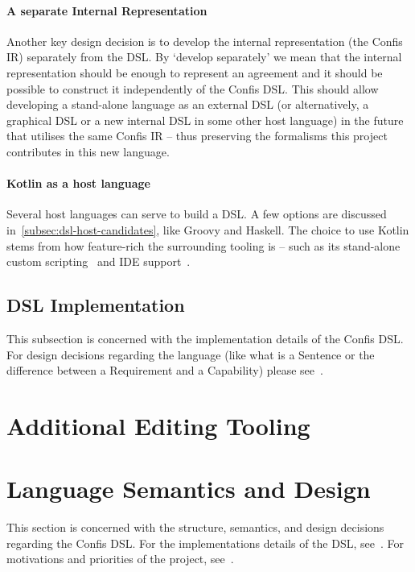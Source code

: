 \paragraph{A separate Internal Representation}
Another key design decision is to develop the internal representation (the Confis IR) separately from the DSL.
By `develop separately' we mean that the internal representation should be enough to represent an agreement and it should be possible to construct it independently of the Confis DSL.
This should allow developing a stand-alone language as an external DSL (or alternatively, a graphical DSL or a new internal DSL in some other host language) in the future that utilises the same Confis IR -- thus preserving the formalisms this project contributes in this new language.

\paragraph{Kotlin as a host language} Several host languages can serve to build a DSL.
A few options are discussed in~\autoref{subsec:dsl-host-candidates}, like Groovy and Haskell.
The choice to use Kotlin stems from how feature-rich the surrounding tooling is -- such as its stand-alone custom scripting~\cite{kotlinScriptKeep} and IDE support~\cite{intelliJRepo}.\\

\subsection{DSL Implementation}\label{subsec:dsl-implementation}

This subsection is concerned with the implementation details of the Confis DSL.
For design decisions regarding the language (like what is a Sentence or the difference between a Requirement and a Capability) please see~.


\section{Additional Editing Tooling}\label{sec:additional-dsl-tooling}


\section{Language Semantics and Design}\label{sec:language-semantics}

This section is concerned with the structure, semantics, and design decisions regarding the Confis DSL.
For the implementations details of the DSL, see~.
For motivations and priorities of the project, see~.

